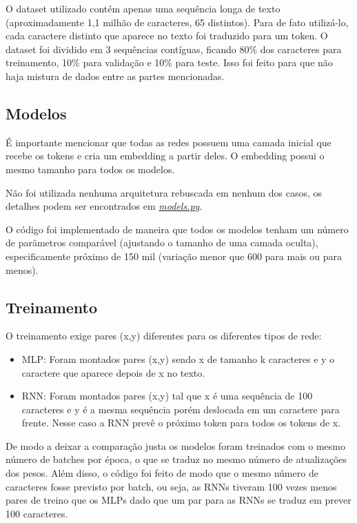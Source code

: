 \documentclass[11pt,a4paper]{article}
\begin{document}
O dataset utilizado contém apenas uma sequência longa de texto (aproximadamente 1,1 milhão de caracteres, 65 distintos). Para de fato utilizá-lo, cada caractere distinto que aparece no texto foi traduzido para um token. O dataset foi dividido em 3 sequências contíguas, ficando 80\% dos caracteres para treinamento, 10\% para validação e 10\% para teste. Isso foi feito para que não haja mistura de dados entre as partes mencionadas.

\subsection{Modelos}
É importante mencionar que todas as redes possuem uma camada inicial que recebe os tokens e cria um embedding a partir deles. O embedding possui o mesmo tamanho para todos os modelos.

Não foi utilizada nenhuma arquitetura rebuscada em nenhum dos casos, os detalhes podem ser encontrados em \href{https://github.com/deconr/MAC5921-DeepLearning/tree/main/ep2/models.py}{\textit{models.py}}.

O código foi implementado de maneira que todos os modelos tenham um número de parâmetros comparável (ajustando o tamanho de uma camada oculta), especificamente próximo de 150 mil (variação menor que 600 para mais ou para menos).

\subsection{Treinamento}
O treinamento exige pares (x,y) diferentes para os diferentes tipos de rede:

\begin{itemize}
    \item MLP: Foram montados pares (x,y) sendo x de tamanho k caracteres e y o caractere que aparece depois de x no texto.
    \item RNN: Foram montados pares (x,y) tal que x é uma sequência de 100 caracteres e y é a mesma sequência porém deslocada em um caractere para frente. Nesse caso a RNN prevê o próximo token para todos os tokens de x.
\end{itemize}

De modo a deixar a comparação justa os modelos foram treinados com o mesmo número de batches por época, o que se traduz no mesmo número de atualizações dos pesos. Além disso, o código foi feito de modo que o mesmo número de caracteres fosse previsto por batch, ou seja, as RNNs tiveram 100 vezes menos pares de treino que os MLPs dado que um par para as RNNs se traduz em prever 100 caracteres.
\end{document}
